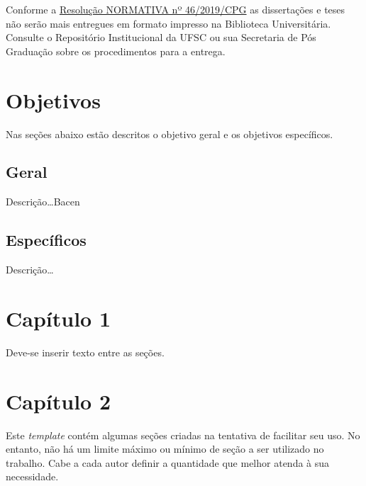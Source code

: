 \documentclass[
	12pt,				%
	oneside,			%
	a4paper,			%
	chapter=TITLE,		%
	section=TITLE,		%
	english,			%
	brazil				%
	]{abntex2}
\begin{document}
Conforme a \href{https://repositorio.ufsc.br/bitstream/handle/123456789/197121/RN46.2019.pdf?sequence=1&isAllowed=y}{Resolução NORMATIVA nº 46/2019/CPG}
as dissertações e teses não serão mais entregues em formato impresso na
Biblioteca Universitária. Consulte o Repositório Institucional da UFSC ou sua
Secretaria de Pós Graduação sobre os procedimentos para a entrega.

\chapter{Objetivos}\label{objetivos}

Nas seções abaixo estão descritos o objetivo geral e os objetivos
específicos.

\section{Geral}\label{geral}

Descrição\ldots{}\gls{Bacen}

\section{Específicos}\label{especuxedficos}

Descrição\ldots{}

\chapter*{Capítulo 1}\label{cap1}

Deve-se inserir texto entre as seções.

\chapter*{Capítulo 2}\label{cap2}

Este \emph{template} contém algumas seções criadas na tentativa de facilitar seu uso.
No entanto, não há um limite máximo ou mínimo de seção a ser utilizado no
trabalho. Cabe a cada autor definir a quantidade que melhor atenda à sua
necessidade.
\end{document}
